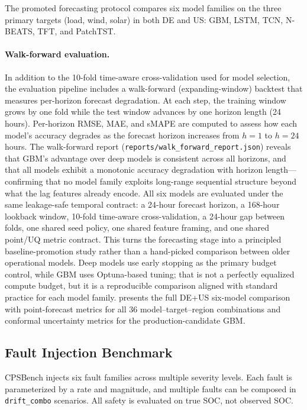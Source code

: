 \documentclass[11pt,a4paper]{article}
\begin{document}
The promoted forecasting protocol compares six model families on the three primary targets (load, wind, solar) in both DE and US: GBM, LSTM, TCN, N-BEATS, TFT, and PatchTST.

\paragraph{Walk-forward evaluation.}
In addition to the 10-fold time-aware cross-validation used for model selection, the evaluation pipeline includes a walk-forward (expanding-window) backtest that measures per-horizon forecast degradation. At each step, the training window grows by one fold while the test window advances by one horizon length (24 hours). Per-horizon RMSE, MAE, and sMAPE are computed to assess how each model's accuracy degrades as the forecast horizon increases from $h=1$ to $h=24$ hours. The walk-forward report (\texttt{reports/walk\_forward\_report.json}) reveals that GBM's advantage over deep models is consistent across all horizons, and that all models exhibit a monotonic accuracy degradation with horizon length---confirming that no model family exploits long-range sequential structure beyond what the lag features already encode. All six models are evaluated under the same leakage-safe temporal contract: a 24-hour forecast horizon, a 168-hour lookback window, 10-fold time-aware cross-validation, a 24-hour gap between folds, one shared seed policy, one shared feature framing, and one shared point/UQ metric contract. This turns the forecasting stage into a principled baseline-promotion study rather than a hand-picked comparison between older operational models. Deep models use early stopping as the primary budget control, while GBM uses Optuna-based tuning; that is not a perfectly equalized compute budget, but it is a reproducible comparison aligned with standard practice for each model family.  presents the full DE+US six-model comparison with point-forecast metrics for all 36 model--target--region combinations and conformal uncertainty metrics for the production-candidate GBM.

\subsection{Fault Injection Benchmark}

CPSBench injects six fault families across multiple severity levels. Each fault is parameterized by a rate and magnitude, and multiple faults can be composed in \texttt{drift\_combo} scenarios. All safety is evaluated on true SOC, not observed SOC.
\end{document}
